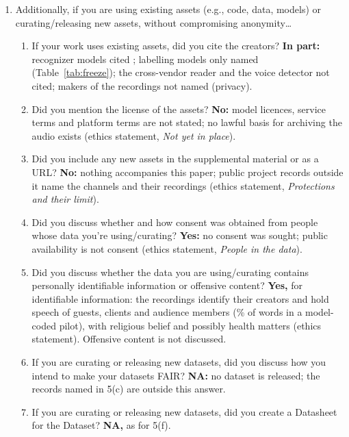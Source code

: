 {\begin{enumerate}
\item Additionally, if you are using existing assets (e.g., code, data, models) or curating/releasing new assets, without compromising anonymity\ldots
\begin{enumerate}
\item If your work uses existing assets, did you cite the creators? \textbf{In part:} recognizer models cited \cite{radford2022robust,gandhi2023distilwhisper}; labelling models only named (Table~\ref{tab:freeze}); the cross-vendor reader and the voice detector not cited; makers of the recordings not named (privacy).
\item Did you mention the license of the assets? \textbf{No:} model licences, service terms and platform terms are not stated; no lawful basis for archiving the audio exists (ethics statement, \emph{Not yet in place}).
\item Did you include any new assets in the supplemental material or as a URL? \textbf{No:} nothing accompanies this paper; public project records outside it name the channels and their recordings (ethics statement, \emph{Protections and their limit}).
\item Did you discuss whether and how consent was obtained from people whose data you're using/curating? \textbf{Yes:} no consent was sought; public availability is not consent (ethics statement, \emph{People in the data}).
\item Did you discuss whether the data you are using/curating contains personally identifiable information or offensive content? \textbf{Yes,} for identifiable information: the recordings identify their creators and hold speech of guests, clients and audience members (\ThirdPartySharePct\% of words in a model-coded pilot), with religious belief and possibly health matters (ethics statement). Offensive content is not discussed.
\item If you are curating or releasing new datasets, did you discuss how you intend to make your datasets FAIR? \textbf{NA:} no dataset is released; the records named in 5(c) are outside this answer.
\item If you are curating or releasing new datasets, did you create a Datasheet for the Dataset? \textbf{NA,} as for 5(f).
\end{enumerate}


\end{enumerate}}
